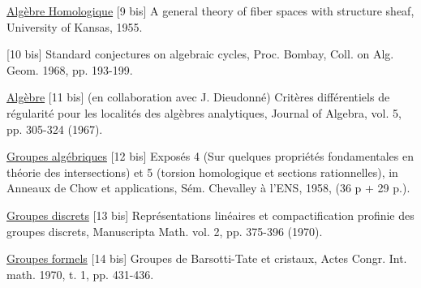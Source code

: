 
\uline{Algèbre Homologique}
[9 bis] A general theory of fiber spaces with structure
sheaf, University of Kansas, 1955.

[10 bis] Standard conjectures on algebraic cycles, Proc.
Bombay, Coll. on Alg. Geom. 1968, pp. 193-199.

\uline{Algèbre}
[11 bis] (en collaboration avec J. Dieudonné) Critères
différentiels de régularité pour les localités
des algèbres analytiques, Journal of Algebra,
vol. 5, pp. 305-324 (1967).

\uline{Groupes algébriques}
[12 bis] Exposés 4 (Sur quelques propriétés fondamentales
en théorie des intersections) et 5 (torsion
homologique et sections rationnelles), in
Anneaux de Chow et applications, Sém. Chevalley
à l'ENS, 1958, (36 p + 29 p.).

\uline{Groupes discrets}
[13 bis] Représentations linéaires et compactification
profinie des groupes discrets, Manuscripta
Math. vol. 2, pp. 375-396 (1970).

\uline{Groupes formels}
[14 bis] Groupes de Barsotti-Tate et cristaux, Actes
Congr. Int. math. 1970, t. 1, pp. 431-436.

